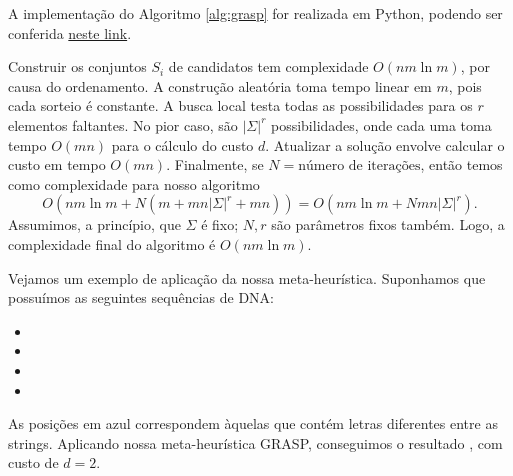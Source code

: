 A implementação do Algoritmo \ref{alg:grasp} for realizada em Python, podendo ser conferida \href{https://github.com/lucasresck/data-structures-algorithms/blob/main/intractable_problems/scripts/closest_string_grasp.py}{neste link}.

Construir os conjuntos $S_i$ de candidatos tem complexidade $O(nm\ln m)$, por causa do ordenamento. A construção aleatória toma tempo linear em $m$, pois cada sorteio é constante. A busca local testa todas as possibilidades para os $r$ elementos faltantes. No pior caso, são $|\Sigma|^r$ possibilidades, onde cada uma toma tempo $O(mn)$ para o cálculo do custo $d$. Atualizar a solução envolve calcular o custo em tempo $O(mn)$. Finalmente, se $N = \text{número de iterações}$, então temos como complexidade para nosso algoritmo
\[O(nm\ln m + N(m + mn|\Sigma|^r + mn)) = O(nm\ln m + Nmn|\Sigma|^r).\]
Assumimos, a princípio, que $\Sigma$ é fixo; $N, r$ são parâmetros fixos também. Logo, a complexidade final do algoritmo é $O(nm\ln m)$.

Vejamos um exemplo de aplicação da nossa meta-heurística. Suponhamos que possuímos as seguintes sequências de DNA:
\begin{itemize}
    \item {}\fbox{\color{blue}{T}}\fbox{\color{blue}{A}}\fbox{\color{blue}{G}}\fbox{\color{blue}{T}}
    \item {}\fbox{\color{blue}{C}}\fbox{\color{blue}{T}}\fbox{\color{blue}{A}}\fbox{\color{blue}{C}}
    \item {}\fbox{\color{blue}{C}}\fbox{\color{blue}{A}}\fbox{\color{blue}{G}}\fbox{\color{blue}{T}}
    \item {}\fbox{\color{blue}{T}}\fbox{\color{blue}{A}}\fbox{\color{blue}{G}}\fbox{\color{blue}{T}}
\end{itemize}
As posições em azul correspondem àquelas que contém letras diferentes entre as strings. Aplicando nossa meta-heurística GRASP, conseguimos o resultado \fbox{\color{blue}{C}}\fbox{\color{blue}{A}}\fbox{\color{blue}{G}}\fbox{\color{blue}{C}}, com custo de $d=2$. 

